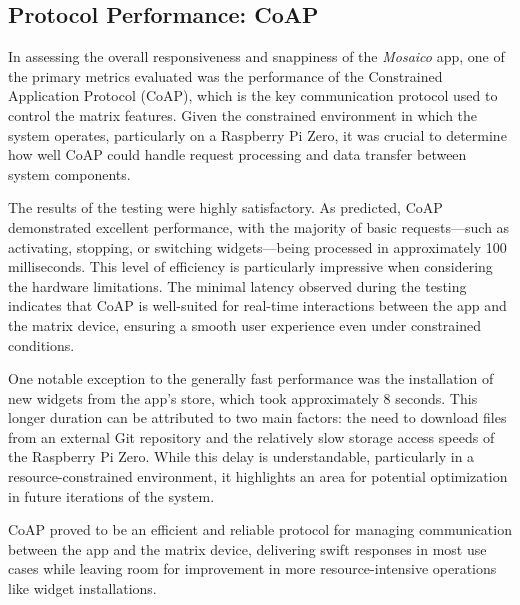 \subsection{Protocol Performance: CoAP}

In assessing the overall responsiveness and snappiness of the \textit{Mosaico} app, one of the primary metrics evaluated was the performance of the Constrained Application Protocol (CoAP), which is the key communication protocol used to control the matrix features. Given the constrained environment in which the system operates, particularly on a Raspberry Pi Zero, it was crucial to determine how well CoAP could handle request processing and data transfer between system components.

The results of the testing were highly satisfactory. As predicted, CoAP demonstrated excellent performance, with the majority of basic requests—such as activating, stopping, or switching widgets—being processed in approximately 100 milliseconds. This level of efficiency is particularly impressive when considering the hardware limitations. The minimal latency observed during the testing indicates that CoAP is well-suited for real-time interactions between the app and the matrix device, ensuring a smooth user experience even under constrained conditions.

\begin{center}
\end{center}

One notable exception to the generally fast performance was the installation of new widgets from the app's store, which took approximately 8 seconds. This longer duration can be attributed to two main factors: the need to download files from an external Git repository and the relatively slow storage access speeds of the Raspberry Pi Zero. While this delay is understandable, particularly in a resource-constrained environment, it highlights an area for potential optimization in future iterations of the system.

CoAP proved to be an efficient and reliable protocol for managing communication between the app and the matrix device, delivering swift responses in most use cases while leaving room for improvement in more resource-intensive operations like widget installations.


